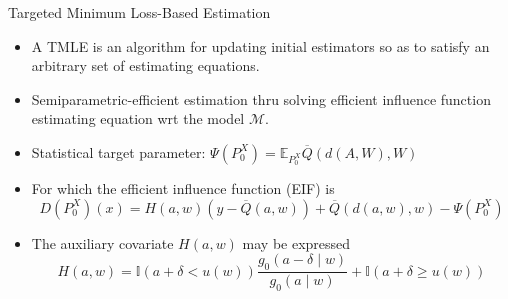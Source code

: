 \documentclass{beamer}
\newcommand{\E}{\mathbb{E}}
\newcommand{\I}{\mathbb{I}}
\newcommand{\M}{\mathcal{M}}
\begin{document}
\begin{frame}[c]{Targeted Minimum Loss-Based Estimation}

\begin{center}
\begin{itemize}
  \itemsep10pt
  \item A TMLE is an algorithm for updating initial estimators so as to satisfy
    an arbitrary set of estimating equations.
  \item Semiparametric-efficient estimation thru solving efficient influence
    function estimating equation wrt the model $\M$.
  \item Statistical target parameter:
    $\Psi(P_0^X) = \E_{P_0^X}{\overline{Q}(d(A, W), W)}$
  \item For which the efficient influence function (EIF) is
    \begin{equation*}
      D(P_0^X)(x) = H(a, w)({y - \overline{Q}(a, w)}) +
      \overline{Q}(d(a, w), w) - \Psi(P_0^X)
    \end{equation*}
  \item The auxiliary covariate $H(a,w)$ may be expressed
    \begin{equation*}
      H(a,w) = \I(a + \delta < u(w)) \frac{g_0(a - \delta \mid w)}
      {g_0(a \mid w)} + \I(a + \delta \geq u(w))
    \end{equation*}
\end{itemize}
\end{center}


\end{frame}

\end{document}
